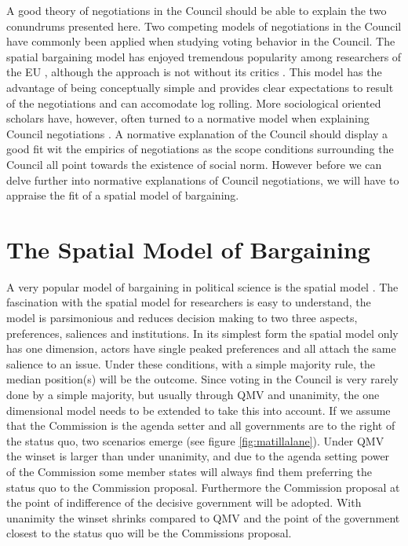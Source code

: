 A good theory of negotiations in the Council should be able to explain the two conundrums presented here. Two competing models of negotiations in the Council have commonly been applied when studying voting behavior in the Council. The spatial bargaining model has enjoyed tremendous popularity  among researchers of the EU \citep{MattilaLane2001, Warntjen2008}, although the approach is not without its critics \citetext{see \citealt{HorlWarntjenWonka2005} for a good overview}. This model has the advantage of being conceptually simple and provides clear expectations to result of the negotiations and can accomodate log rolling. More sociological oriented scholars have, however, often turned to a normative model when explaining Council negotiations \citep{Lewis2005,Heisenberg2005}. A normative explanation of the Council should display a good fit wit the empirics of negotiations as the scope conditions surrounding the Council all point towards the existence of social norm. However before we can delve further into normative explanations of Council negotiations, we will have to appraise the fit of a spatial model of bargaining. 



\section{The Spatial Model of Bargaining}

A very popular model of bargaining in political science is the spatial model \citep{Downs1957}.  The fascination with the spatial model for researchers is easy to understand, the model is parsimonious and reduces decision making to two three aspects, preferences, saliences and institutions. In its simplest form the spatial model only has one dimension, actors have single peaked preferences and all attach the same salience to an issue. Under these conditions, with a simple majority rule, the median position(s) will be the outcome. Since voting in the Council is very rarely done by a simple majority, but usually through QMV and unanimity, the one dimensional model needs to be extended to take this into account. If we assume that the Commission is the agenda setter and all governments are to the right of the status quo, two scenarios emerge (see figure \ref{fig:matillalane}). Under QMV the winset is larger than under unanimity, and due to the agenda setting power of the Commission some member states will always find them preferring the status quo to the Commission proposal. Furthermore the Commission proposal at the point of indifference of the decisive government will be adopted. With unanimity the winset shrinks compared to QMV and the point of the government closest to the status quo will be the Commissions proposal. 


